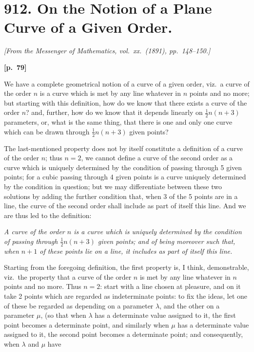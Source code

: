 \documentclass[11pt,a4paper]{article}
\theoremstyle{plain}
\begin{document}
\newpage

\section*{912. On the Notion of a Plane Curve of a Given Order.}

\noindent\textit{[From the Messenger of Mathematics, vol.\ xx.\ (1891), pp.\ 148--150.]}

\vspace{0.5em}
\noindent\textbf{[p.\ 79]}

We have a complete geometrical notion of a curve of a given order, viz.\ a curve of the order $n$ is a curve which is met by any line whatever in $n$ points and no more; but starting with this definition, how do we know that there exists a curve of the order $n$? and, further, how do we know that it depends linearly on $\frac{1}{2}n(n + 3)$ parameters, or, what is the same thing, that there is one and only one curve which can be drawn through $\frac{1}{2}n(n + 3)$ given points?

The last-mentioned property does not by itself constitute a definition of a curve of the order $n$; thus $n = 2$, we cannot define a curve of the second order as a curve which is uniquely determined by the condition of passing through 5 given points; for a cubic passing through 4 given points is a curve uniquely determined by the condition in question; but we may differentiate between these two solutions by adding the further condition that, when 3 of the 5 points are in a line, the curve of the second order shall include as part of itself this line. And we are thus led to the definition:

\smallskip
\textit{A curve of the order $n$ is a curve which is uniquely determined by the condition of passing through $\frac{1}{2}n(n + 3)$ given points; and of being moreover such that, when $n + 1$ of these points lie on a line, it includes as part of itself this line.}
\smallskip

Starting from the foregoing definition, the first property is, I think, demonstrable, viz.\ the property that a curve of the order $n$ is met by any line whatever in $n$ points and no more. Thus $n = 2$: start with a line chosen at pleasure, and on it take 2 points which are regarded as indeterminate points: to fix the ideas, let one of these be regarded as depending on a parameter $\lambda$, and the other on a parameter $\mu$, (so that when $\lambda$ has a determinate value assigned to it, the first point becomes a determinate point, and similarly when $\mu$ has a determinate value assigned to it, the second point becomes a determinate point; and consequently, when $\lambda$ and $\mu$ have
\end{document}
